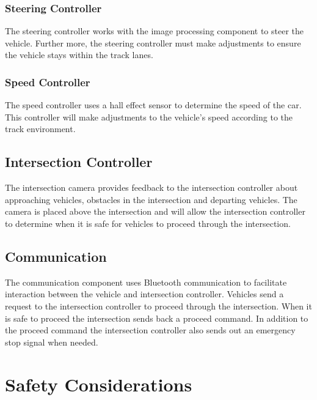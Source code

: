 \documentclass [10pt]{article}
\begin{document}
\subsubsection{Steering Controller}
The steering controller works with the image processing component to steer the vehicle. Further more, the steering controller must make adjustments to ensure the vehicle stays within the track lanes. 

\subsubsection{Speed Controller} 
The speed controller uses a hall effect sensor to determine the speed of the car. This controller will make adjustments to the vehicle's speed according to the track environment.  


\subsection{Intersection Controller}
The intersection camera provides feedback to the intersection controller about approaching vehicles, obstacles in the intersection and departing vehicles. The camera is placed above the intersection and will allow the intersection controller to determine when it is safe for vehicles to proceed through the intersection. 

\subsection{Communication }
The communication component uses Bluetooth communication to facilitate interaction between the vehicle and intersection controller. Vehicles send a request to the intersection controller to proceed through the intersection. When it is safe to proceed the intersection sends back a proceed command. In addition to the proceed command the intersection controller also sends out an emergency stop signal when needed. 










\section{Safety Considerations}
\end{document}
